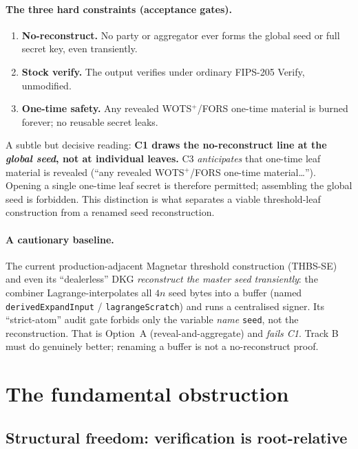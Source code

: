 \documentclass[11pt,a4paper]{article}
\begin{document}
\paragraph{The three hard constraints (acceptance gates).}
\begin{enumerate}[leftmargin=1.7em,label=\textbf{C\arabic*.}]
\item \textbf{No-reconstruct.} No party or aggregator ever forms the global seed or
full secret key, even transiently.
\item \textbf{Stock verify.} The output verifies under ordinary FIPS-205 Verify,
unmodified.
\item \textbf{One-time safety.} Any revealed WOTS$^+$/FORS one-time material is
burned forever; no reusable secret leaks.
\end{enumerate}

A subtle but decisive reading: \textbf{C1 draws the no-reconstruct line at the
\emph{global seed}, not at individual leaves.} C3 \emph{anticipates} that one-time
leaf material is revealed (``any revealed WOTS$^+$/FORS one-time material\dots'').
Opening a single one-time leaf secret is therefore permitted; assembling the global
seed is forbidden. This distinction is what separates a viable threshold-leaf
construction from a renamed seed reconstruction.

\paragraph{A cautionary baseline.}
The current production-adjacent Magnetar threshold construction (THBS-SE) and even
its ``dealerless'' DKG \emph{reconstruct the master seed transiently}: the combiner
Lagrange-interpolates all $4n$ seed bytes into a buffer (named
\texttt{derivedExpandInput} / \texttt{lagrangeScratch}) and runs a centralised
signer. Its ``strict-atom'' audit gate forbids only the variable \emph{name}
\texttt{seed}, not the reconstruction. That is Option~A (reveal-and-aggregate) and
\emph{fails C1}. Track B must do genuinely better; renaming a buffer is not a
no-reconstruct proof.

\section{The fundamental obstruction}
\label{sec:obstruction}

\subsection{Structural freedom: verification is root-relative}
\label{sec:freedom}
\end{document}
